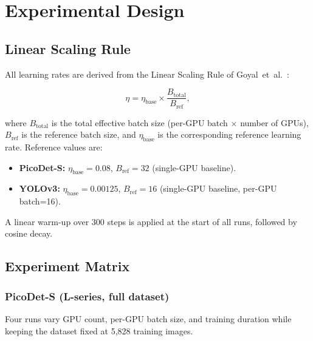 \section{Experimental Design}
\label{sec:experiments}

\subsection{Linear Scaling Rule}

All learning rates are derived from the Linear Scaling Rule of
Goyal~et~al.~\citep{goyal2017accurate}:

\begin{equation}
  \eta = \eta_\text{base} \times \frac{B_\text{total}}{B_\text{ref}},
  \label{eq:lsr}
\end{equation}

\noindent where $B_\text{total}$ is the total effective batch size
(per-GPU batch $\times$ number of GPUs), $B_\text{ref}$ is the
reference batch size, and $\eta_\text{base}$ is the corresponding
reference learning rate.  Reference values are:

\begin{itemize}[leftmargin=1.5em]
  \item \textbf{PicoDet-S:} $\eta_\text{base}=0.08$, $B_\text{ref}=32$
    (single-GPU baseline).
  \item \textbf{YOLOv3:} $\eta_\text{base}=0.00125$, $B_\text{ref}=16$
    (single-GPU baseline, per-GPU batch=16).
\end{itemize}

A linear warm-up over 300 steps is applied at the start of all runs,
followed by cosine decay.

\subsection{Experiment Matrix}

\subsubsection{PicoDet-S (L-series, full dataset)}

Four runs vary GPU count, per-GPU batch size, and training duration
while keeping the dataset fixed at 5,828 training images.

